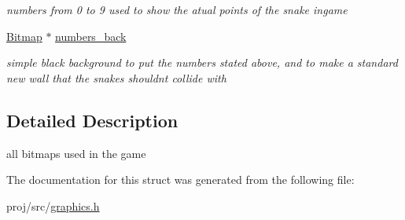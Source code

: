 \begin{DoxyCompactItemize}
\begin{DoxyCompactList}\small\item\em numbers from 0 to 9 used to show the atual points of the snake ingame \end{DoxyCompactList}\item 
\hyperlink{structBitmap}{Bitmap} $\ast$ \hyperlink{group__graphics_ga416a4e7839cf0a547fcf830f0e5e3cf3}{numbers\+\_\+back}
\begin{DoxyCompactList}\small\item\em simple black background to put the numbers stated above, and to make a standard new wall that the snakes should\textquotesingle{}nt collide with \end{DoxyCompactList}\end{DoxyCompactItemize}


\subsection{Detailed Description}
all bitmaps used in the game 

The documentation for this struct was generated from the following file\+:\begin{DoxyCompactItemize}
\item 
proj/src/\hyperlink{graphics_8h}{graphics.\+h}\end{DoxyCompactItemize}
